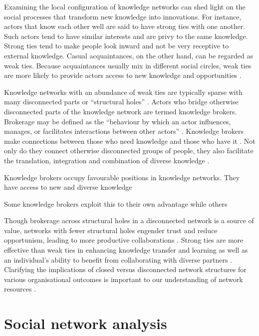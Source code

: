 Examining the local configuration of knowledge networks can shed light on the social processes that transform new knowledge into innovations. For instance, actors that know each other well are said to have strong ties with one another. Such actors tend to have similar interests and are privy to the same knowledge. Strong ties tend to make people look inward and not be very receptive to external knowledge. Casual acquaintances, on the other hand, can be regarded as weak ties. Because acquaintances usually mix in different social circles, weak ties are more likely to provide actors access to new knowledge and opportunities \citep{granovetter1973strength}. \medskip

Knowledge networks with an abundance of weak ties are typically sparse with many disconnected parts or \enquote{structural holes} \citep{burt1992structural}. Actors who bridge otherwise disconnected parts of the knowledge network are termed knowledge brokers. Brokerage may be defined as the \enquote{behaviour by which an actor influences, manages, or facilitates interactions between other actors} \citep{obstfeld2014brokerage}. Knowledge brokers make connections between those who need knowledge and those who have it \citep{davenport1998successful}. Not only do they connect otherwise disconnected groups of people, they also facilitate the translation, integration and combination of diverse knowledge \citep{davis2010agency}. \medskip

Knowledge brokers occupy favourable positions in knowledge networks. They have access to new and diverse knowledge

Some knowledge brokers exploit this to their own advantage while others 

Though brokerage across structural holes in a disconnected network is a source of value, networks with fewer structural holes engender trust and reduce opportunism, leading to more productive collaborations \citep{ahuja2000collaboration}. Strong ties are more effective than weak ties in enhancing knowledge transfer and learning as well as an individual’s ability to benefit from collaborating with diverse partners \citep{rost2011strength,phelps2012knowledge,tortoriello2012bridging}. Clarifying the implications of closed versus disconnected network structures for various organisational outcomes is important to our understanding of network resources \citep{ahuja2000collaboration}. \medskip

\section{Social network analysis}

